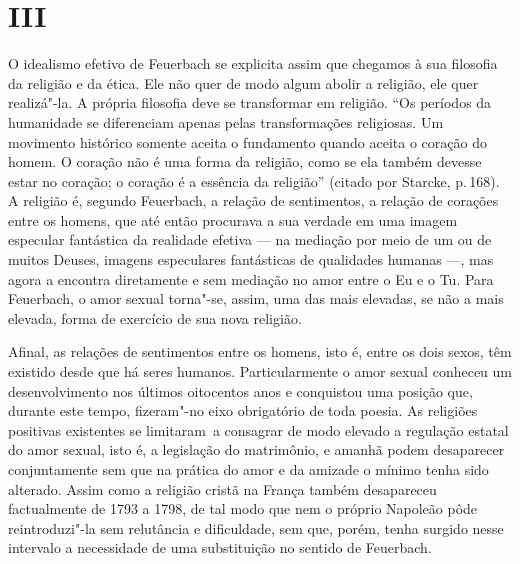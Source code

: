 \vspace{2cm}

\section{III}

\noindent{}O idealismo efetivo
de Feuerbach se
explicita assim que chegamos à sua filosofia da religião e da ética. Ele
não quer de modo algum abolir a religião, ele quer realizá"-la. A própria
filosofia deve se transformar em religião. ``Os 
períodos da humanidade se diferenciam apenas pelas transformações
religiosas. Um movimento histórico somente aceita o fundamento quando
aceita o coração do homem. O coração não é uma forma da religião, como
se ela também devesse estar no coração; o coração é a essência da
religião'' (citado por Starcke, p.\,168). A religião é,
segundo Feuerbach,
a relação de sentimentos, a relação de corações entre os homens, que até
então procurava a sua verdade em uma imagem especular fantástica da
realidade efetiva --- na mediação por meio de um ou de muitos Deuses, %
imagens especulares fantásticas de qualidades humanas ---, mas agora a
encontra diretamente e sem mediação no amor entre o Eu e o Tu.
Para Feuerbach,
o amor sexual torna"-se, assim, uma das mais elevadas, se não a mais
elevada, forma de exercício de sua nova religião.

Afinal, as relações de sentimentos entre os homens, isto é, entre os
dois sexos, têm existido desde que há seres humanos. Particularmente o
amor sexual conheceu um desenvolvimento nos últimos oitocentos anos e
conquistou uma posição que, durante este tempo, fizeram"-no eixo
obrigatório de toda poesia. As religiões positivas existentes se
limitaram\est\ a consagrar de modo elevado a regulação estatal do amor
sexual, isto é, a legislação do matrimônio, e amanhã podem desaparecer
conjuntamente sem que na prática do amor e da amizade o mínimo tenha
sido alterado. Assim como a religião cristã na França também desapareceu %
factualmente de 1793 a 1798, de tal modo que nem o próprio Napoleão pôde
reintroduzi"-la sem relutância e dificuldade, sem que, porém, tenha
surgido nesse intervalo a necessidade de uma substituição no
sentido de Feuerbach.

